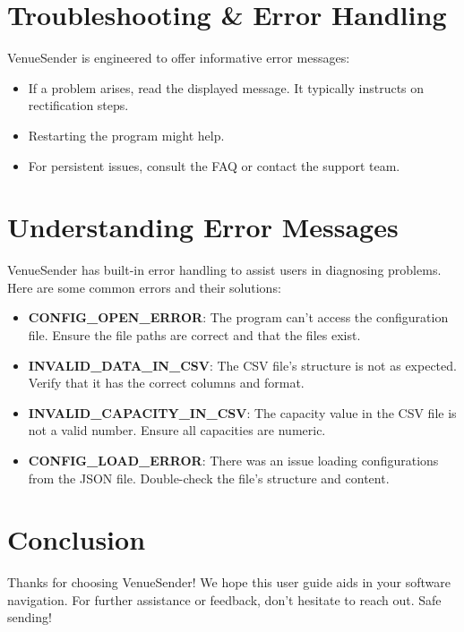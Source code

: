 \documentclass{article}
\begin{document}
	\section*{Troubleshooting \& Error Handling}
	VenueSender is engineered to offer informative error messages:
	\begin{itemize}
		\item If a problem arises, read the displayed message. It typically instructs on rectification steps.
		\item Restarting the program might help.
		\item For persistent issues, consult the FAQ or contact the support team.
	\end{itemize}
	
	\section*{Understanding Error Messages}
	VenueSender has built-in error handling to assist users in diagnosing problems. Here are some common errors and their solutions:
	\begin{itemize}
		\item \textbf{CONFIG\_OPEN\_ERROR}: The program can't access the configuration file. Ensure the file paths are correct and that the files exist.
		\item \textbf{INVALID\_DATA\_IN\_CSV}: The CSV file's structure is not as expected. Verify that it has the correct columns and format.
		\item \textbf{INVALID\_CAPACITY\_IN\_CSV}: The capacity value in the CSV file is not a valid number. Ensure all capacities are numeric.
		\item \textbf{CONFIG\_LOAD\_ERROR}: There was an issue loading configurations from the JSON file. Double-check the file's structure and content.
	\end{itemize}
	
	\section*{Conclusion}
	Thanks for choosing VenueSender! We hope this user guide aids in your software navigation. For further assistance or feedback, don't hesitate to reach out. Safe sending!
	
\end{document}
